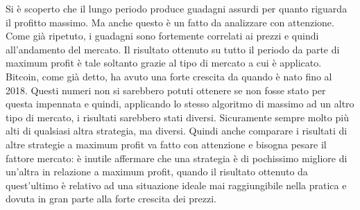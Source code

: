 \documentclass[a4paper,12pt]{report}
\begin{document}
\begin{fig}
Si è scoperto che il lungo periodo produce guadagni assurdi per quanto riguarda il profitto massimo. Ma anche questo è un fatto da analizzare con attenzione. Come già ripetuto, i guadagni sono fortemente correlati ai prezzi e quindi all'andamento del mercato. Il risultato ottenuto su tutto il periodo da parte di maximum profit è tale soltanto grazie al tipo di mercato a cui è applicato. Bitcoin, come già detto, ha avuto una forte crescita da quando è nato fino al 2018. Questi numeri non si sarebbero potuti ottenere se non fosse stato per questa impennata e quindi, applicando lo stesso algoritmo di massimo ad un altro tipo di mercato, i risultati sarebbero stati diversi. Sicuramente sempre molto più alti di qualsiasi altra strategia, ma diversi. Quindi anche comparare i risultati di altre strategie a maximum profit va fatto con attenzione e bisogna pesare il fattore mercato: è inutile affermare che una strategia è di pochissimo migliore di un'altra in relazione a maximum profit, quando il risultato ottenuto da quest'ultimo è relativo ad una situazione ideale mai raggiungibile nella pratica e dovuta in gran parte alla forte crescita dei prezzi.

\newpage

\end{fig}
\end{document}
